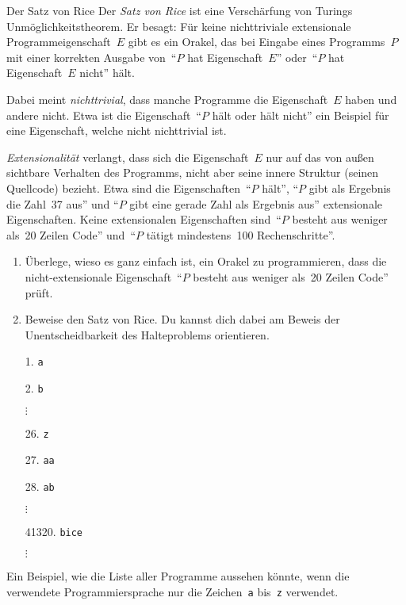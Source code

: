 \documentclass[twoside]{../zirkelblatt1415}
\theoremstyle{definition}
\theoremstyle{plain}
\theoremstyle{remark}
\begin{document}
\begin{aufgabeShaded}{Der Satz von Rice}
Der \emph{Satz von Rice} ist eine Verschärfung von Turings
Unmöglichkeitstheorem. Er besagt: Für keine nichttriviale extensionale
Programmeigenschaft~$E$ gibt es ein Orakel, das bei Eingabe
eines Programms~$P$ mit einer korrekten Ausgabe von~"`$P$ hat Eigenschaft~$E$"'
oder~"`$P$ hat Eigenschaft~$E$ nicht"' hält.

Dabei meint \emph{nichttrivial}, dass manche Programme die Eigenschaft~$E$
haben und andere nicht. Etwa ist die Eigenschaft~"`$P$ hält oder hält nicht"'
ein Beispiel für eine Eigenschaft, welche nicht nichttrivial ist.

\emph{Extensionalität} verlangt, dass sich die Eigenschaft~$E$ nur auf das von
außen sichtbare Verhalten des Programms, nicht aber seine innere Struktur
(seinen Quellcode) bezieht. Etwa sind die Eigenschaften~"`$P$ hält"',
"`$P$ gibt als Ergebnis die Zahl~37 aus"' und "`$P$ gibt eine gerade Zahl als
Ergebnis aus"' extensionale Eigenschaften. Keine extensionalen Eigenschaften
sind~"`$P$ besteht aus weniger als~20 Zeilen Code"' und~"`$P$ tätigt
mindestens~100 Rechenschritte"'.

\begin{enumerate}
\item Überlege, wieso es ganz einfach ist, ein Orakel zu programmieren, dass
die nicht-extensionale Eigenschaft~"`$P$ besteht aus weniger als~20 Zeilen
Code"' prüft.
\item Beweise den Satz von Rice. Du kannst dich dabei am Beweis der
Unentscheidbarkeit des Halteproblems orientieren.
\end{enumerate}
\vspace{-1em}
\end{aufgabeShaded}

\begin{table}[b]
  \begin{enumerate}
    \item[1.] \texttt{a}
    \item[2.] \texttt{b}
    \item[] $\vdots$
    \item[26.] \texttt{z}
    \item[27.] \texttt{aa}
    \item[28.] \texttt{ab}
    \item[] $\vdots$
    \item[41320.] \texttt{bice}
    \item[] $\vdots$
  \end{enumerate}
  \centering
  \caption{\label{tafel:liste-aller-programme}Ein Beispiel, wie die Liste aller
  Programme aussehen könnte, wenn die verwendete Programmiersprache nur die
  Zeichen~\texttt{a} bis~\texttt{z} verwendet.}
\end{table}
\end{document}
